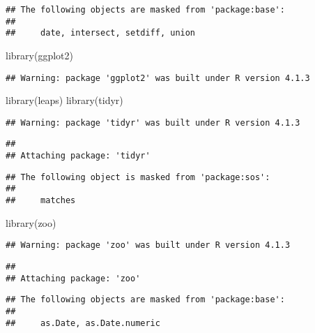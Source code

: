 \documentclass[
]{article}
\newenvironment{Shaded}{\begin{snugshade}}{\end{snugshade}}
\newcommand{\FunctionTok}[1]{\textcolor[rgb]{0.00,0.00,0.00}{#1}}
\newcommand{\NormalTok}[1]{#1}
\begin{document}
\begin{verbatim}
## The following objects are masked from 'package:base':
## 
##     date, intersect, setdiff, union
\end{verbatim}

\begin{Shaded}
\begin{Highlighting}[]
\FunctionTok{library}\NormalTok{(ggplot2)}
\end{Highlighting}
\end{Shaded}

\begin{verbatim}
## Warning: package 'ggplot2' was built under R version 4.1.3
\end{verbatim}

\begin{Shaded}
\begin{Highlighting}[]
\FunctionTok{library}\NormalTok{(leaps)}
\FunctionTok{library}\NormalTok{(tidyr)}
\end{Highlighting}
\end{Shaded}

\begin{verbatim}
## Warning: package 'tidyr' was built under R version 4.1.3
\end{verbatim}

\begin{verbatim}
## 
## Attaching package: 'tidyr'
\end{verbatim}

\begin{verbatim}
## The following object is masked from 'package:sos':
## 
##     matches
\end{verbatim}

\begin{Shaded}
\begin{Highlighting}[]
\FunctionTok{library}\NormalTok{(zoo)}
\end{Highlighting}
\end{Shaded}

\begin{verbatim}
## Warning: package 'zoo' was built under R version 4.1.3
\end{verbatim}

\begin{verbatim}
## 
## Attaching package: 'zoo'
\end{verbatim}

\begin{verbatim}
## The following objects are masked from 'package:base':
## 
##     as.Date, as.Date.numeric
\end{verbatim}
\end{document}
